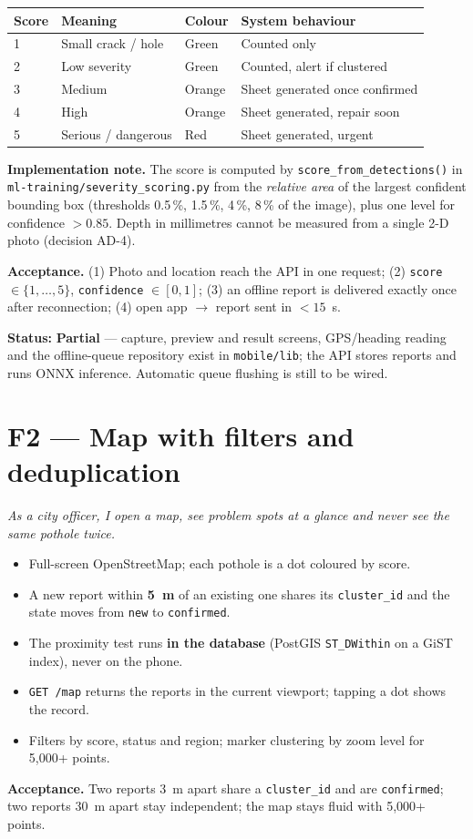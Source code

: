\documentclass[11pt,a4paper,oneside]{report}
\newcommand{\sPart}{\textcolor{warnorange}{\textbf{Partial}}}
\begin{document}
\begin{longtable}{@{}L{1.2cm}L{4cm}L{2cm}L{6.4cm}@{}}
\toprule\textbf{Score} & \textbf{Meaning} & \textbf{Colour} & \textbf{System behaviour}\\\midrule{} & Small crack / hole & Green & Counted only\\
2 & Low severity & Green & Counted, alert if clustered\\
3 & Medium & Orange & Sheet generated once confirmed\\
4 & High & Orange & Sheet generated, repair soon\\
5 & Serious / dangerous & Red & Sheet generated, urgent\\\bottomrule
\end{longtable}
\textbf{Implementation note.} The score is computed by \texttt{score\_from\_detections()} in
\texttt{ml-training/severity\_scoring.py} from the \emph{relative area} of the largest confident bounding box
(thresholds 0.5\,\%, 1.5\,\%, 4\,\%, 8\,\% of the image), plus one level for confidence $>0.85$. Depth in
millimetres cannot be measured from a single 2-D photo (decision AD-4).

\textbf{Acceptance.} (1) Photo and location reach the API in one request; (2) \texttt{score}
$\in\{1,\dots,5\}$, \texttt{confidence} $\in[0,1]$; (3) an offline report is delivered exactly once after
reconnection; (4) open app $\rightarrow$ report sent in $<15$~s.

\textbf{Status:} \sPart{} --- capture, preview and result screens, GPS/heading reading and the offline-queue
repository exist in \texttt{mobile/lib}; the API stores reports and runs ONNX inference. Automatic queue flushing is still to be wired.

\section{F2 --- Map with filters and deduplication}
\textit{As a city officer, I open a map, see problem spots at a glance and never see the same pothole twice.}
\begin{itemize}
\item Full-screen OpenStreetMap; each pothole is a dot coloured by score.
\item A new report within \textbf{5~m} of an existing one shares its \texttt{cluster\_id} and the state moves from
\texttt{new} to \texttt{confirmed}.
\item The proximity test runs \textbf{in the database} (PostGIS \texttt{ST\_DWithin} on a GiST index), never on the phone.
\item \texttt{GET /map} returns the reports in the current viewport; tapping a dot shows the record.
\item Filters by score, status and region; marker clustering by zoom level for 5{,}000+ points.
\end{itemize}
\textbf{Acceptance.} Two reports 3~m apart share a \texttt{cluster\_id} and are \texttt{confirmed}; two reports
30~m apart stay independent; the map stays fluid with 5{,}000+ points.
\end{document}
